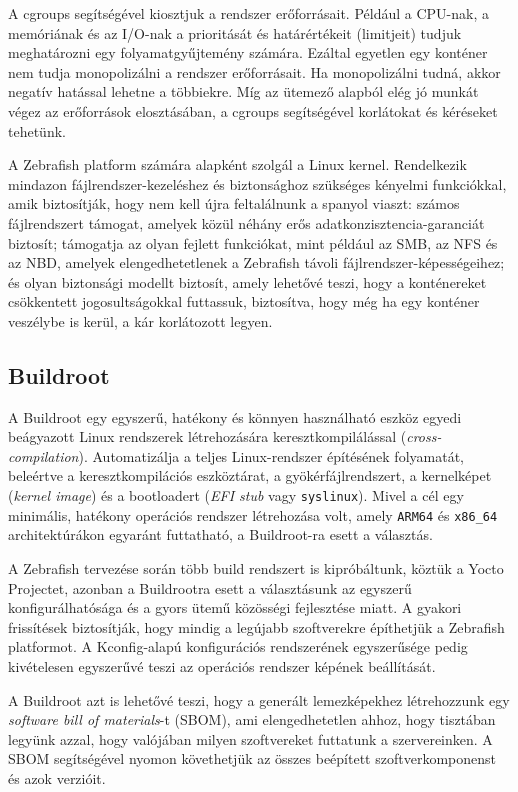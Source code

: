A cgroups segítségével kiosztjuk a rendszer erőforrásait. Például a CPU-nak, a memóriának és az I/O-nak a prioritását és határértékeit (limitjeit) tudjuk meghatározni egy folyamatgyűjtemény számára. Ezáltal egyetlen egy konténer nem tudja monopolizálni a rendszer erőforrásait. Ha monopolizálni tudná, akkor negatív hatással lehetne a többiekre. Míg az ütemező alapból elég jó munkát végez az erőforrások elosztásában, a cgroups segítségével korlátokat és kéréseket tehetünk.

A Zebrafish platform számára alapként szolgál a Linux kernel. Rendelkezik mindazon fájlrendszer-kezeléshez és biztonsághoz szükséges kényelmi funkciókkal, amik biztosítják, hogy nem kell újra feltalálnunk a spanyol viaszt: számos fájlrendszert támogat, amelyek közül néhány erős adatkonzisztencia-garanciát biztosít; támogatja az olyan fejlett funkciókat, mint például az SMB, az NFS és az NBD, amelyek elengedhetetlenek a Zebrafish távoli fájlrendszer-képességeihez; és olyan biztonsági modellt biztosít, amely lehetővé teszi, hogy a konténereket csökkentett jogosultságokkal futtassuk, biztosítva, hogy még ha egy konténer veszélybe is kerül, a kár korlátozott legyen.

\subsection{Buildroot}

A Buildroot egy egyszerű, hatékony és könnyen használható eszköz egyedi beágyazott Linux rendszerek létrehozására keresztkompilálással (\textit{cross-compilation}). Automatizálja a teljes Linux-rendszer építésének folyamatát, beleértve a keresztkompilációs eszköztárat, a gyökérfájlrendszert, a kernelképet (\textit{kernel image}) és a bootloadert (\textit{EFI stub} vagy \texttt{syslinux}). Mivel a cél egy minimális, hatékony operációs rendszer létrehozása volt, amely \texttt{ARM64} és \texttt{x86\_64} architektúrákon egyaránt futtatható, a Buildroot-ra esett a választás.

A Zebrafish tervezése során több build rendszert is kipróbáltunk, köztük a Yocto Projectet, azonban a Buildrootra esett a választásunk az egyszerű konfigurálhatósága és a gyors ütemű közösségi fejlesztése miatt. A gyakori frissítések biztosítják, hogy mindig a legújabb szoftverekre építhetjük a Zebrafish platformot. A Kconfig-alapú konfigurációs rendszerének egyszerűsége pedig kivételesen egyszerűvé teszi az operációs rendszer képének beállítását.

A Buildroot azt is lehetővé teszi, hogy a generált lemezképekhez létrehozzunk egy \textit{software bill of materials}-t (SBOM), ami elengedhetetlen ahhoz, hogy tisztában legyünk azzal, hogy valójában milyen szoftvereket futtatunk a szervereinken. A SBOM segítségével nyomon követhetjük az összes beépített szoftverkomponenst és azok verzióit.

